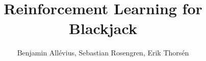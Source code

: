 \documentclass{beamer}
\title[Reinforcement Learning]{ Reinforcement Learning for Blackjack} %
\author{Benjamin Allévius, Sebastian Rosengren, Erik Thorsén} %
\institute[SU] %
{
Department of Mathematics, Stockholm University
}
\date %
\begin{document}
	
\begin{frame}
	\titlepage %
	\centering
\end{frame}



\end{document}
